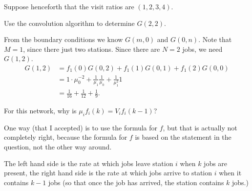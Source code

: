Suppose henceforth that the visit ratios are $(1,2,3,4)$. 

\begin{exercise}[201706]
  Use the convolution algorithm to determine $G(2,2)$.
\begin{solution}
    From the boundary conditions we know $G(m, 0)$ and $G(0,n)$. Note
    that $M=1$, since there just two stations. Since there are $N=2$
    jobs, we need $G(1,2)$. 
    \begin{equation*}
      \begin{split}
      G(1,2) &= f_1(0) G(0, 2) + f_1(1) G(0, 1) + f_1(2) G(0,0) \\
       &= 1\cdot \mu_0^{-2}  + \frac1{\mu_1} \frac{1}{\mu_0}  + \frac{1}{\mu_1^2} 1 \\
       &= \frac 1{16} + \frac1{12}  + \frac{1}{9}.
      \end{split}
    \end{equation*}
\end{solution}
\end{exercise}

\begin{exercise}[201706]
For this network, why is $\mu_i f_i(k) = V_i f_i(k-1)$? 
\begin{solution}
  One way (that I accepted)  is to use the formula for $f$, but that is actually not completely right, because the formula for $f$ is based on the statement in the question, not the other way around. 

The left hand side is the rate at which jobs leave station $i$ when $k$ jobs are present, the right hand side is the rate at which jobs arrive to station $i$ when it contains $k-1$ jobs (so that once the job has arrived, the station contains $k$ jobs.)
\end{solution}
\end{exercise}



